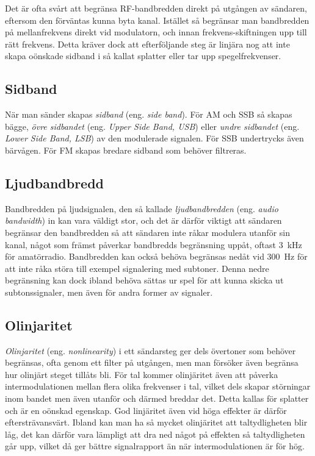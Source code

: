 Det är ofta svårt att begränsa RF-bandbredden direkt på utgången av sändaren,
eftersom den förväntas kunna byta kanal.
Istället så begränsar man bandbredden på mellanfrekvens direkt vid modulatorn,
och innan frekvens-skiftningen upp till rätt frekvens.
Detta kräver dock att efterföljande steg är linjära nog att inte skapa oönskade
sidband i så kallat splatter eller tar upp spegelfrekvenser.

\newpage
\subsection{Sidband}

När man sänder skapas \emph{sidband} (eng. \emph{side band}).
För AM och SSB så skapas bägge, \emph{övre sidbandet}
(eng. \emph{Upper Side Band, USB}) eller \emph{undre sidbandet}
(eng. \emph{Lower Side Band, LSB}) av den modulerade signalen.
För SSB undertrycks även bärvågen.
För FM skapas bredare sidband som behöver filtreras.

\subsection{Ljudbandbredd}

Bandbredden på ljudsignalen, den så kallade \emph{ljudbandbredden} (eng.
\emph{audio bandwidth}) in kan vara väldigt stor, och det är därför viktigt
att sändaren begränsar den bandbredden så att sändaren inte råkar modulera
utanför sin kanal, något som främst påverkar bandbredds begränsning uppåt,
oftast \qty{3}{\kilo\hertz} för amatörradio.
Bandbredden kan också behöva begränsas nedåt vid \qty{300}{\hertz} för att inte
råka störa till exempel signalering med subtoner.
Denna nedre begränsning kan dock ibland behöva sättas ur spel för att
kunna skicka ut subtonssignaler, men även för andra former av signaler.

\subsection{Olinjaritet}

\emph{Olinjaritet} (eng. \emph{nonlinearity}) i ett sändarsteg ger dels
övertoner som behöver begränsas, ofta genom ett filter på utgången, men man
försöker även begränsa hur olinjärt steget tillåts bli.
För tal kommer olinjäritet även att påverka intermodulationen mellan flera
olika frekvenser i tal, vilket dels skapar störningar inom bandet men även
utanför och därmed breddar det.
Detta kallas för splatter och är en oönskad egenskap.
God linjäritet även vid höga effekter är därför eftersträvansvärt.
Ibland kan man ha så mycket olinjäritet att taltydligheten blir låg, det
kan därför vara lämpligt att dra ned något på effekten så taltydligheten går
upp, vilket då ger bättre signalrapport än när intermodulationen är för hög.

